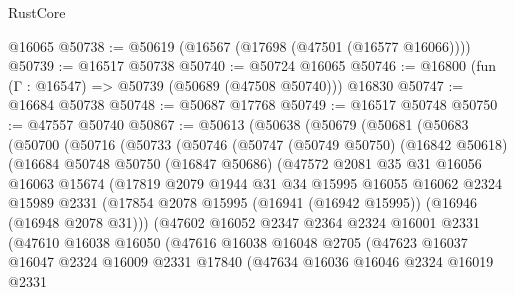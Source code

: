 \begin{lexlean}{RustCore}
\begin{coremodule}
    @16065
@50738 := @50619 (@16567 (@17698 (@47501 (@16577 @16066))))
@50739 := @16517 @50738
@50740 := @50724 @16065
@50746 := @16800 (fun (Γ : @16547) => @50739 (@50689 (@47508 @50740))) @16830
@50747 := @16684 @50738
@50748 := @50687 @17768
@50749 := @16517 @50748
@50750 := @47557 @50740
@50867 := @50613
    (@50638
      (@50679
        (@50681
          (@50683
            (@50700
              (@50716
                (@50733
                  (@50746
                    (@50747
                      (@50749 @50750)
                      (@16842 @50618)
                      (@16684
                        @50748
                        @50750
                        (@16847 @50686)
                        (@47572
                          @2081
                          @35
                          @31
                          @16056
                          @16063
                          @15674
                          (@17819
                            @2079
                            @1944
                            @31
                            @34
                            @15995
                            @16055
                            @16062
                            @2324
                            @15989
                            @2331
                            (@17854
                              @2078
                              @15995
                              (@16941 (@16942 @15995))
                              (@16946 (@16948 @2078 @31)))
                            (@47602
                              @16052
                              @2347
                              @2364
                              @2324
                              @16001
                              @2331
                              (@47610
                                @16038
                                @16050
                                (@47616
                                  @16038
                                  @16048
                                  @2705
                                  (@47623
                                    @16037
                                    @16047
                                    @2324
                                    @16009
                                    @2331
                                    @17840
                                    (@47634
                                      @16036
                                      @16046
                                      @2324
                                      @16019
                                      @2331

\end{coremodule}
\end{lexlean}
